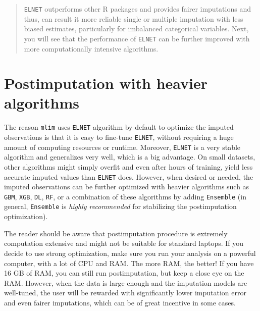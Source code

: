 \begin{quote}
    \texttt{ELNET} outperforms other R packages and provides fairer imputations  and thus, can result it more reliable single or multiple imputation with less biased estimates, particularly for imbalanced categorical variables. Next, you will see that the performance of \texttt{ELNET} can be further improved with more computationally intensive algorithms. 
\end{quote}

\section{Postimputation with heavier algorithms}

The reason \texttt{mlim} uses \texttt{ELNET} algorithm by default to optimize the imputed observations is that it is easy to fine-tune \texttt{ELNET}, without requiring a huge amount of computing resources or runtime. Moreover, \texttt{ELNET} is a very stable algorithm and generalizes very well, which is a big advantage. On small datasets, other algorithms might simply overfit and even after hours of training, yield less accurate imputed values than \texttt{ELNET} does. However, when desired or needed, the imputed observations can be further optimized with heavier algorithms such as \texttt{GBM}, \texttt{XGB}, \texttt{DL}, \texttt{RF}, or a combination of these algorithms by adding \texttt{Ensemble} (in general, \texttt{Ensemble} is \textit{highly recommended} for stabilizing the postimputation optimization). 

The reader should be aware that postimputation procedure is extremely computation extensive and might not be suitable for standard laptops. If you decide to use strong optimization, make sure you run your analysis on a powerful computer, with a lot of CPU and RAM. The more RAM, the better! If you have 16 GB of RAM, you can still run postimputation, but keep a close eye on the RAM. However, when the data is large enough and the imputation models are well-tuned, the user will be rewarded with significantly lower imputation error and even fairer imputations, which can be of great incentive in some cases. 

